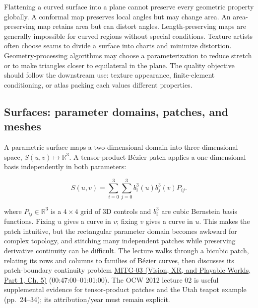 \hypertarget{03-visual-computing-i-ch002-parameterization-distortions}{}

Flattening a curved surface into a plane cannot preserve every geometric property globally. A conformal map preserves local angles but may change area. An area-preserving map retains area but can distort angles. Length-preserving maps are generally impossible for curved regions without special conditions. Texture artists often choose seams to divide a surface into charts and minimize distortion. Geometry-processing algorithms may choose a parameterization to reduce stretch or to make triangles closer to equilateral in the plane. The quality objective should follow the downstream use: texture appearance, finite-element conditioning, or atlas packing each values different properties.

\subsection{Surfaces: parameter domains, patches, and meshes}\label{03-visual-computing-i-ch002-surfaces-parameter-domains-patches-and-meshes}

\hypertarget{03-visual-computing-i-ch002-surfaces-parameter-domains-patches-and-meshes}{}

A parametric surface maps a two-dimensional domain into three-dimensional space, \(S(u,v)\mapsto\mathbb R^3\). A tensor-product Bézier patch applies a one-dimensional basis independently in both parameters:

\[
S(u,v)=\sum_{i=0}^{3}\sum_{j=0}^{3} b_i^3(u)b_j^3(v)P_{ij}.
\]

where \(P_{ij}\in\mathbb{R}^3\) is a \(4\times4\) grid of 3D controls and \(b_i^3\) are cubic Bernstein basis functions. Fixing \(u\) gives a curve in \(v\); fixing \(v\) gives a curve in \(u\). This makes the patch intuitive, but the rectangular parameter domain becomes awkward for complex topology, and stitching many independent patches while preserving derivative continuity can be difficult. The lecture walks through a bicubic patch, relating its rows and columns to families of Bézier curves, then discusses its patch-boundary continuity problem \href{../07-Vision-XR-and-Playable-Worlds-P01/main.pdf\#nameddest=04-visual-computing-ii-ch036-mitg-03---curves-and-surfaces}{MITG-03 (Vision, XR, and Playable Worlds, Part 1, Ch. 5)} (00:47:00--01:01:00). The OCW 2012 lecture 02 is useful supplemental evidence for tensor-product patches and the Utah teapot example (pp.~24--34); its attribution/year must remain explicit.


